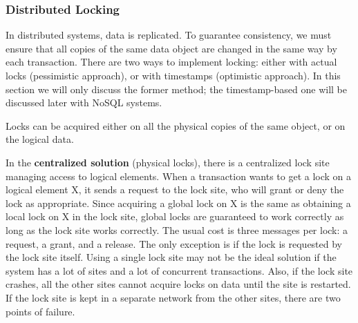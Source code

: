 \subsubsection{Distributed Locking}

In distributed systems, data is replicated. To guarantee consistency, we must ensure that all copies of the same data object are changed in the same way by each transaction. There are two ways to implement locking: either with actual locks (pessimistic approach), or with timestamps (optimistic approach). In this section we will only discuss the former method; the timestamp-based one will be discussed later with NoSQL systems.

Locks can be acquired either on all the physical copies of the same object, or on the logical data.

In the \textbf{centralized solution} (physical locks), there is a centralized lock site managing access to logical elements. When a transaction wants to get a lock on a logical element X, it sends a request to the lock site, who will grant or deny the lock as appropriate. Since acquiring a global lock on X is the same as obtaining a local lock on X in the lock site, global locks are guaranteed to work correctly as long as the lock site works correctly. The usual cost is three messages per lock: a request, a grant, and a release. The only exception is if the lock is requested by the lock site itself. Using a single lock site may not be the ideal solution if the system has a lot of sites and a lot of concurrent transactions. Also, if the lock site crashes, all the other sites cannot acquire locks on data until the site is restarted. If the lock site is kept in a separate network from the other sites, there are two points of failure.

